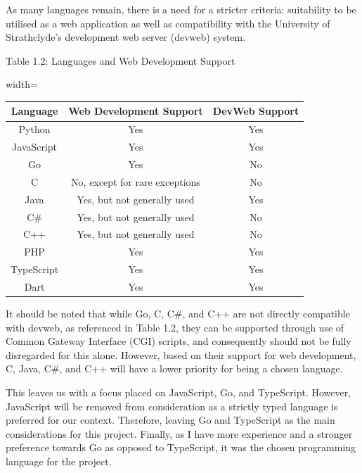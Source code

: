 \documentclass[11pt,titlepage,dvipsnames,table,xcdraw]{article}
\begin{document}
As many languages remain, there is a need for a stricter criteria: suitability to be utilised as a web application as well as compatibility with the University of Strathclyde's development web server (devweb) system.
\begin{center}
Table 1.2: Languages and Web Development Support
\begin{adjustbox}{width=\textwidth}
\begin{tabular}{ c | c | c}
Language & Web Development Support & DevWeb Support \\
\hline
Python & Yes & Yes \\
JavaScript & Yes & Yes \\
Go & Yes & No \\
C & No, except for rare exceptions & No \\
Java & Yes, but not generally used & Yes \\
C\# & Yes, but not generally used & No \\ 
C++ & Yes, but not generally used & No \\
PHP & Yes & Yes \\
TypeScript & Yes & Yes \\
Dart & Yes & Yes \\
\end{tabular}
\end{adjustbox}
\end{center}
It should be noted that while Go, C, C\#, and C++ are not directly compatible with devweb, as referenced in Table 1.2, they can be supported through use of Common Gateway Interface (CGI) scripts, and consequently should not be fully disregarded for this alone. However, based on their support for web development, C, Java, C\#, and C++ will have a lower priority for being a chosen language.

This leaves us with a focus placed on JavaScript, Go, and TypeScript. However, JavaScript will be removed from consideration as a strictly typed language is preferred for our context. Therefore, leaving Go and TypeScript as the main considerations for this project. Finally, as I have more experience and a stronger preference towards Go as opposed to TypeScript, it was the chosen programming language for the project.
\end{document}
